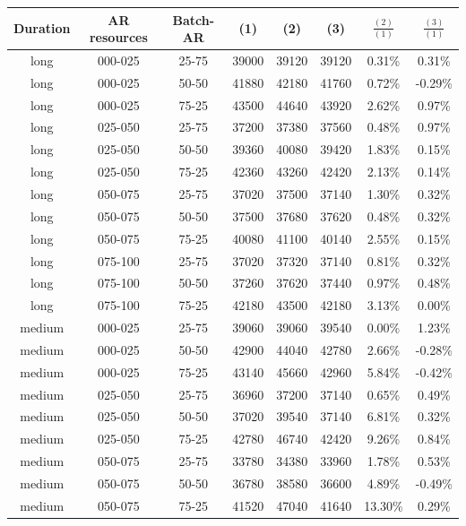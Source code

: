 \begin{table}
\begin{center}
\begin{tabular}{|c|c|c|c|c|c|c|c|}
\hline
\textbf{Duration} & \textbf{AR resources} & \textbf{Batch-AR} & \textbf{(1)} & \textbf{(2)} & \textbf{(3)} &  \textbf{$\frac{(2)}{(1)}$} & \textbf{$\frac{(3)}{(1)}$}
\\\hline
long & 000-025 & 25-75 & 39000 & 39120 & 39120 & 0.31\% & 0.31\%
\\\hline
long & 000-025 & 50-50 & 41880 & 42180 & 41760 & 0.72\% & -0.29\%
\\\hline
long & 000-025 & 75-25 & 43500 & 44640 & 43920 & 2.62\% & 0.97\%
\\\hline
long & 025-050 & 25-75 & 37200 & 37380 & 37560 & 0.48\% & 0.97\%
\\\hline
long & 025-050 & 50-50 & 39360 & 40080 & 39420 & 1.83\% & 0.15\%
\\\hline
long & 025-050 & 75-25 & 42360 & 43260 & 42420 & 2.13\% & 0.14\%
\\\hline
long & 050-075 & 25-75 & 37020 & 37500 & 37140 & 1.30\% & 0.32\%
\\\hline
long & 050-075 & 50-50 & 37500 & 37680 & 37620 & 0.48\% & 0.32\%
\\\hline
long & 050-075 & 75-25 & 40080 & 41100 & 40140 & 2.55\% & 0.15\%
\\\hline
long & 075-100 & 25-75 & 37020 & 37320 & 37140 & 0.81\% & 0.32\%
\\\hline
long & 075-100 & 50-50 & 37260 & 37620 & 37440 & 0.97\% & 0.48\%
\\\hline
long & 075-100 & 75-25 & 42180 & 43500 & 42180 & 3.13\% & 0.00\%
\\\hline
medium & 000-025 & 25-75 & 39060 & 39060 & 39540 & 0.00\% & 1.23\%
\\\hline
medium & 000-025 & 50-50 & 42900 & 44040 & 42780 & 2.66\% & -0.28\%
\\\hline
medium & 000-025 & 75-25 & 43140 & 45660 & 42960 & 5.84\% & -0.42\%
\\\hline
medium & 025-050 & 25-75 & 36960 & 37200 & 37140 & 0.65\% & 0.49\%
\\\hline
medium & 025-050 & 50-50 & 37020 & 39540 & 37140 & 6.81\% & 0.32\%
\\\hline
medium & 025-050 & 75-25 & 42780 & 46740 & 42420 & 9.26\% & 0.84\%
\\\hline
medium & 050-075 & 25-75 & 33780 & 34380 & 33960 & 1.78\% & 0.53\%
\\\hline
medium & 050-075 & 50-50 & 36780 & 38580 & 36600 & 4.89\% & -0.49\%
\\\hline
medium & 050-075 & 75-25 & 41520 & 47040 & 41640 & 13.30\% & 0.29\%

\end{tabular}
\end{center}
\end{table}
